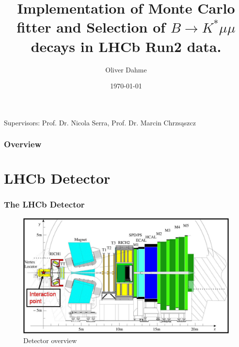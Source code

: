 \documentclass{beamer}
\title[Master Thesis]{Implementation of Monte Carlo fitter and Selection of $B \rightarrow K^* \mu \mu$ decays in LHCb Run2 data.} %
\author{Oliver Dahme} %
\institute[UZH] %
{
University of Zurich \\ %
\medskip
\textit{o.dahme@cern.ch} %
}
\date{\today} %
\begin{document}
\begin{frame}
 \titlepage %
 \centering Supervisors: Prof. Dr. Nicola Serra, Prof. Dr. Marcin Chrzs\k{a}szcz
\end{frame}

\begin{frame}
 \frametitle{Overview} %
 \tableofcontents %
\end{frame}



\section{LHCb Detector}

\begin{frame}
  \frametitle{The LHCb Detector}

  \begin{figure}
    \includegraphics[width=1.0\linewidth]{figures/lhcb_detector}
    \caption{Detector overview}
  \end{figure}

\end{frame}
\end{document}
